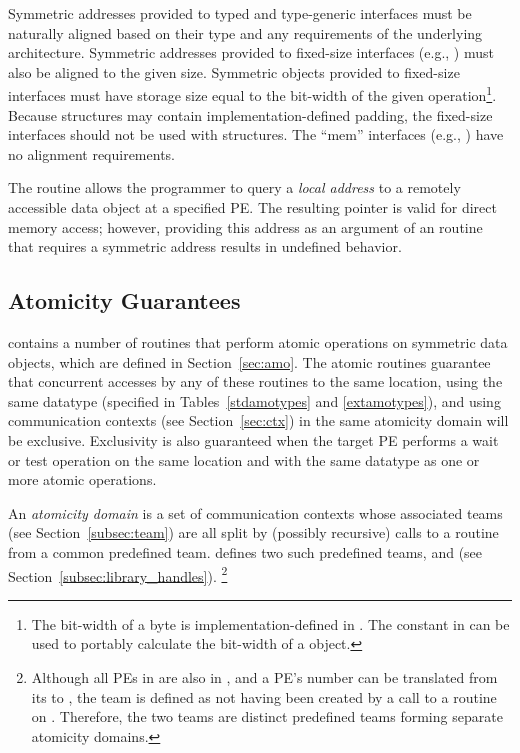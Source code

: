 Symmetric addresses provided to typed and type-generic \openshmem interfaces
must be naturally aligned based on their type and any requirements of the
underlying architecture.  Symmetric addresses provided to fixed-size \openshmem
interfaces (e.g., ) must also be aligned to the given
size.  Symmetric objects provided to fixed-size \openshmem interfaces
must have storage size equal to the bit-width of the given
operation\footnote{The bit-width of a byte is implementation-defined in \Cstd.  The
 constant in  can be used to portably
calculate the bit-width of a \Cstd object.}.  Because \CorCpp{} structures may
contain implementation-defined padding, the fixed-size interfaces should not be
used with \CorCpp{} structures.
The ``mem'' interfaces (e.g., ) have no alignment
requirements.

The  routine allows the programmer to query a {\em local
address} to a remotely accessible data object at a specified \ac{PE}.  The
resulting pointer is valid for direct memory access; however, providing this
address as an argument of an \openshmem routine that requires a symmetric
address results in undefined behavior.

\subsection{Atomicity Guarantees}\label{subsec:amo_guarantees}

\openshmem contains a number of routines that perform atomic operations on
symmetric data objects, which are defined in Section~\ref{sec:amo}.
The atomic routines
guarantee that concurrent accesses by any of these routines to the same
location, using the same datatype (specified in Tables~\ref{stdamotypes} and
\ref{extamotypes}), and using communication contexts (see Section~\ref{sec:ctx})
in the same atomicity domain will be exclusive.
Exclusivity is also guaranteed when the target \ac{PE} performs a wait or test
operation on the same location and with the same datatype as one or more atomic
operations.

An \openshmem \emph{atomicity domain} is a set of communication
contexts whose associated teams (see Section~\ref{subsec:team}) are
all split by (possibly recursive) calls to a
 routine from a common predefined team.
\openshmem defines two such predefined teams, 
and  (see Section~\ref{subsec:library_handles}).%
\footnote{
  Although all \acp{PE} in  are also
  in , and a \ac{PE}'s number can be
  translated from its  to
  , the
   team is defined as not having
  been created by a call to a  routine on
  .
  Therefore, the two teams are distinct predefined teams forming
  separate atomicity domains.
}

